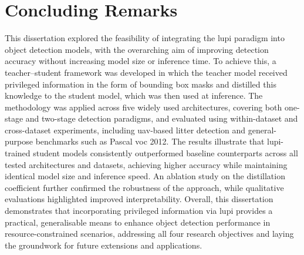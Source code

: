 \section{Concluding Remarks}
\label{sec:6_concluding_remarks}

This dissertation explored the feasibility of integrating the \gls{lupi} paradigm into object detection models, with the overarching aim of improving detection accuracy without increasing model size or inference time. To achieve this, a teacher–student framework was developed in which the teacher model received privileged information in the form of bounding box masks and distilled this knowledge to the student model, which was then used at inference. The methodology was applied across five widely used architectures, covering both one-stage and two-stage detection paradigms, and evaluated using within-dataset and cross-dataset experiments, including \gls{uav}-based litter detection and general-purpose benchmarks such as Pascal \gls{voc} 2012.
The results illustrate that \gls{lupi}-trained student models consistently outperformed baseline counterparts across all tested architectures and datasets, achieving higher accuracy while maintaining identical model size and inference speed. An ablation study on the distillation coefficient further confirmed the robustness of the approach, while qualitative evaluations highlighted improved interpretability. Overall, this dissertation demonstrates that incorporating privileged information via \gls{lupi} provides a practical, generalisable means to enhance object detection performance in resource-constrained scenarios, addressing all four research objectives and laying the groundwork for future extensions and applications.








